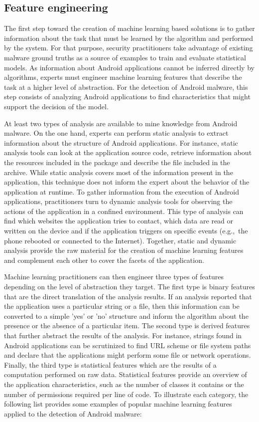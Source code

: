 \subsection{Feature engineering}
The first step toward the creation of machine learning based solutions is to gather information about the task that must be learned by the algorithm and performed by the system.
For that purpose, security practitioners take advantage of existing malware ground truths as a source of examples to train and evaluate statistical models.
As information about Android applications cannot be inferred directly by algorithms, experts must engineer machine learning features that describe the task at a higher level of abstraction.
For the detection of Android malware, this step consists of analyzing Android applications to find characteristics that might support the decision of the model.

At least two types of analysis are available to mine knowledge from Android malware.
On the one hand, experts can perform static analysis to extract information about the structure of Android applications.
For instance, static analysis tools can look at the application source code, retrieve information about the resources included in the package and describe the file included in the archive.
While static analysis covers most of the information present in the application, this technique does not inform the expert about the behavior of the application at runtime.
To gather information from the execution of Android applications, practitioners turn to dynamic analysis tools for observing the actions of the application in a confined environment.
This type of analysis can find which websites the application tries to contact, which data are read or written on the device and if the application triggers on specific events (e.g.,\ the phone rebooted or connected to the Internet).
Together, static and dynamic analysis provide the raw material for the creation of machine learning features and complement each other to cover the facets of the application.

Machine learning practitioners can then engineer three types of features depending on the level of abstraction they target.
The first type is binary features that are the direct translation of the analysis results.
If an analysis reported that the application uses a particular string or a file, then this information can be converted to a simple 'yes' or 'no' structure and inform the algorithm about the presence or the absence of a particular item.
The second type is derived features that further abstract the results of the analysis.
For instance, strings found in Android applications can be scrutinized to find URL scheme or file system paths and declare that the applications might perform some file or network operations.
Finally, the third type is statistical features which are the results of a computation performed on raw data.
Statistical features provide an overview of the application characteristics, such as the number of classes it contains or the number of permissions required per line of code.
To illustrate each category, the following list provides some examples of popular machine learning features applied to the detection of Android malware:

